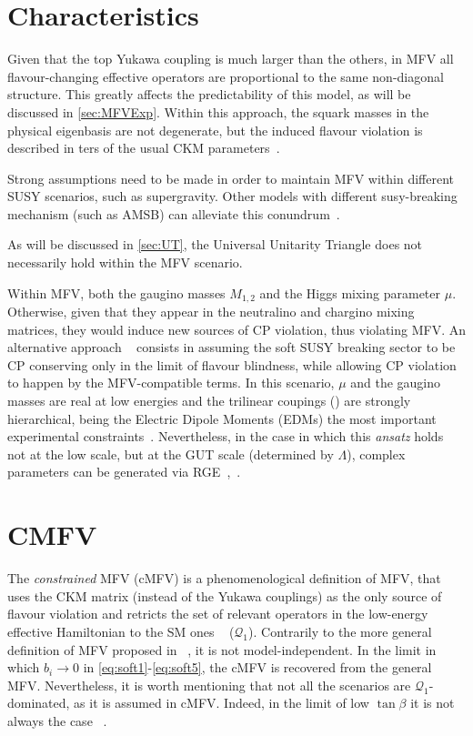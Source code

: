 
\section{Characteristics}
\label{sec:MFVChar}
Given that the top Yukawa coupling is much larger than the others, in MFV all flavour-changing effective operators are proportional to the same non-diagonal structure. This greatly affects the predictability of this model, as will be discussed in \ref{sec:MFVExp}. 
Within this approach, the squark masses in the physical eigenbasis are not degenerate, but the induced flavour violation is described in ters of the usual CKM parameters~\cite{DAmbrosio:2002vsn}. 

Strong assumptions need to be made in order to maintain MFV within different SUSY scenarios, such as supergravity. Other models with different susy-breaking mechanism (such as AMSB) can alleviate this conundrum~\cite{DAmbrosio:2002vsn}.

As will be discussed in \ref{sec:UT}, the Universal Unitarity Triangle does not necessarily hold within the MFV scenario. 

Within MFV, both the gaugino masses $M_{1,2}$ and the Higgs mixing parameter $\mu$. Otherwise, given that they appear in the neutralino and chargino mixing matrices, they would induce new sources of CP violation, thus violating MFV. An alternative approach ~\cite{Straub:2009jd} consists in assuming the soft SUSY breaking sector to be CP conserving only in the limit of flavour blindness, while allowing CP violation to happen by the MFV-compatible terms. In this scenario, $\mu$ and the gaugino masses are real at low energies and the trilinear coupings () are strongly hierarchical, being the Electric Dipole Moments (EDMs) the most important experimental constraints~\cite{Paradisi:2009ey}. Nevertheless, in the case in which this \textit{ansatz} holds not at the low scale, but at the GUT scale (determined by $\Lambda$), complex parameters can be generated via RGE~\cite{Paradisi:2009ey},~\cite{Straub:2009jd}.
\section{CMFV}
\label{sec:CMFV}
The \textit{constrained} MFV (cMFV) is a phenomenological definition of MFV, that uses the CKM matrix (instead of the Yukawa couplings) as the only source of flavour violation and retricts the set of relevant operators in the low-energy effective Hamiltonian to the SM ones ~\cite{Altmannshofer:2007cs} ($\mathcal{Q}_1$).%
Contrarily to the more general definition of MFV proposed in ~\cite{DAmbrosio:2002vsn}, it is not model-independent. In the limit in which $b_i \rightarrow 0$ in \ref{eq:soft1}-\ref{eq:soft5}, the cMFV is recovered from the general MFV. Nevertheless, it is worth mentioning that not all the scenarios are $\mathcal{Q}_1$-dominated, as it is assumed in cMFV. Indeed, in the limit of low $\tan{\beta}$ it is not always the case ~\cite{Altmannshofer:2007cs}. 


